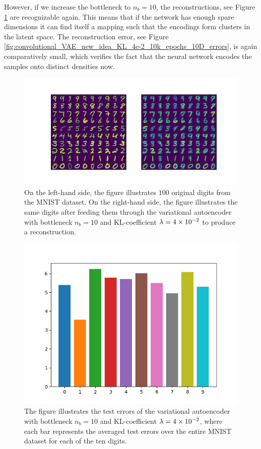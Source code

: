 However, if we increase the bottleneck to $n_b=10$, the reconstructions, see Figure \ref{fig:convolutional_VAE_snd_KL_4e-2_10k_epochs_10D_inference} are recognizable again. This means that if the network has enough \glqq spare dimensions\grqq{} it can find itself a mapping such that the encodings form clusters in the latent space. The reconstruction error, see Figure \ref{fig:convolutional_VAE_new_idea_KL_4e-2_10k_epochs_10D_errors}, is again comparatively small, which verifies the fact that the neural network encodes the samples onto distinct densities now.

\begin{figure}
\begin{center}
      \includegraphics[trim = 15mm 10mm 15mm 15mm, clip, width=\linewidth]{convolutional_VAE_snd_KL_4e-2_10k_epochs_10D_inference}
\end{center}
\caption{On the left-hand side, the figure illustrates $100$ original digits from the MNIST dataset. On the right-hand side, the figure illustrates the same digits after feeding them through the variational autoencoder with bottleneck $n_b=10$ and KL-coefficient $\lambda=\num{4e-2}$ to produce a reconstruction.}\label{fig:convolutional_VAE_snd_KL_4e-2_10k_epochs_10D_inference}
\end{figure}


\begin{figure}
\begin{center}
      \includegraphics[width=0.49\linewidth]{convolutional_VAE_snd_KL_4e-2_10k_epochs_10D_errors}
\end{center}
\caption{The figure illustrates the test errors of the variational autoencoder with bottleneck $n_b=10$ and KL-coefficient $\lambda = \num{4e-2}$, where each bar represents the averaged test errors over the entire MNIST dataset for each of the ten digits.}\label{fig:convolutional_VAE_snd_KL_4e-2_10k_epochs_10D_errors}
\end{figure}


